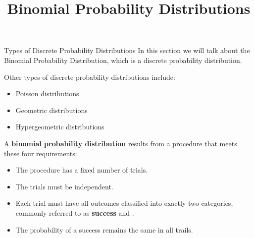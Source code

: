 \documentclass{beamer}
\title[MA205 - Section 5.2]{Binomial Probability Distributions}
\begin{document}
\begin{frame}
\titlepage
\end{frame}

\begin{frame}
\begin{block}{Types of Discrete Probability Distributions}
In this section we will talk about the Binomial Probability Distribution, which is a discrete probability distribution. 

\vspace{1mm}
Other types of discrete probability distributions include:
\begin{itemize}
\item Poisson distributions
\item Geometric distributions
\item Hypergeometric distributions
\end{itemize}
\end{block}\pause

\begin{definition}
A \textbf{binomial probability distribution} results from a procedure that meets these four requirements:\pause
\begin{itemize}
\item The procedure has a fixed number of trials.\pause
\item The trials must be independent.\pause
\item Each trial must have all outcomes classified into exactly two categories, commonly referred to as \textbf{success} and .\pause
\item The probability of a success remains the same in all trails.
\end{itemize}
\end{definition}
\end{frame}
\end{document}
